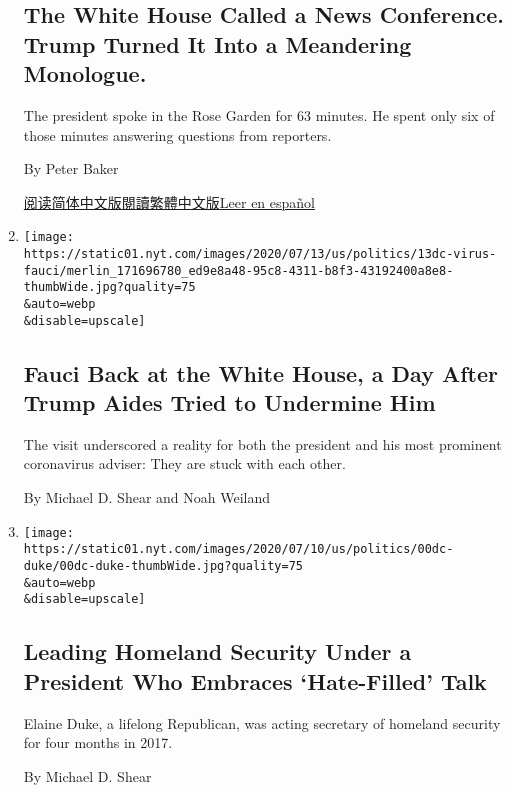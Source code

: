 \begin{enumerate}
{  \subsection{The White House Called a News Conference. Trump Turned It
  Into a Meandering
  Monologue.}\label{the-white-house-called-a-news-conference-trump-turned-it-into-a-meandering-monologue}}

  The president spoke in the Rose Garden for 63 minutes. He spent only
  six of those minutes answering questions from reporters.

  By Peter Baker

  \href{https://cn.nytimes.com/usa/20200715/trump-news-conference/}{阅读简体中文版}\href{https://cn.nytimes.com/usa/20200715/trump-news-conference/zh-hant/}{閱讀繁體中文版}\href{https://www.nytimes.com/es/2020/07/15/espanol/estados-unidos/trump-conferencia-prensa.html}{Leer
  en español}
\item
  \href{/2020/07/13/us/politics/fauci-trump-coronavirus.html}{}

  \texttt{[image: https://static01.nyt.com/images/2020/07/13/us/politics/13dc-virus-fauci/merlin\_171696780\_ed9e8a48-95c8-4311-b8f3-43192400a8e8-thumbWide.jpg?quality=75\\\&auto=webp\\\&disable=upscale]}

  \hypertarget{fauci-back-at-the-white-house-a-day-after-trump-aides-tried-to-undermine-him}{%
  \subsection{Fauci Back at the White House, a Day After Trump Aides
  Tried to Undermine
  Him}\label{fauci-back-at-the-white-house-a-day-after-trump-aides-tried-to-undermine-him}}

  The visit underscored a reality for both the president and his most
  prominent coronavirus adviser: They are stuck with each other.

  By Michael D. Shear and Noah Weiland
\item
  \href{/2020/07/10/us/politics/elaine-duke-homeland-security-trump.html}{}

  \texttt{[image: https://static01.nyt.com/images/2020/07/10/us/politics/00dc-duke/00dc-duke-thumbWide.jpg?quality=75\\\&auto=webp\\\&disable=upscale]}

  \hypertarget{leading-homeland-security-under-a-president-who-embraces-hate-filled-talk}{%
  \subsection{Leading Homeland Security Under a President Who Embraces
  `Hate-Filled'
  Talk}\label{leading-homeland-security-under-a-president-who-embraces-hate-filled-talk}}

  Elaine Duke, a lifelong Republican, was acting secretary of homeland
  security for four months in 2017.

  By Michael D. Shear
\end{enumerate}

